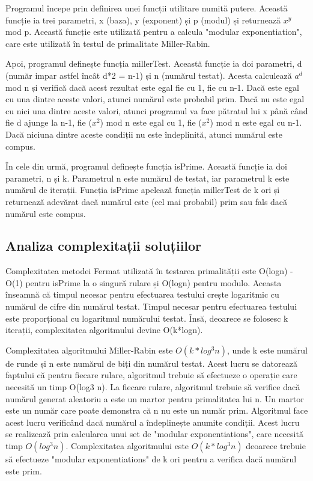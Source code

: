 \documentclass[runningheads]{llncs}
\begin{document}
Programul începe prin definirea unei funcții utilitare numită putere. Această funcție ia trei parametri, x (baza), y (exponent) și p (modul) și
returnează $x^y$ mod p. Această funcție este utilizată pentru a calcula "modular exponentiation", care este utilizată în testul
de primalitate Miller-Rabin.

Apoi, programul definește funcția millerTest. Această funcție ia doi parametri, d (număr impar astfel încât d*2 = n-1) și n (numărul testat). Acesta calculează $a^d$ mod n și verifică
dacă acest rezultat este egal fie cu 1, fie cu n-1. Dacă este egal cu una dintre aceste valori, atunci numărul este probabil prim.
Dacă nu este egal cu nici una dintre aceste valori, atunci programul va face pătratul lui x până când fie d ajunge la n-1, fie ($x^2$) mod n
este egal cu 1, fie ($x^2$) mod n este egal cu n-1. Dacă niciuna dintre aceste condiții nu este îndeplinită, atunci numărul este compus.

În cele din urmă, programul definește funcția isPrime. Această funcție ia doi parametri, n și k. Parametrul n este numărul de testat,
iar parametrul k este numărul de iterații. Funcția isPrime apelează funcția millerTest de k ori și returnează adevărat dacă numărul
este (cel mai probabil) prim sau fals dacă numărul este compus.

\subsection{Analiza complexitații soluțiilor}
\quad \quad Complexitatea metodei Fermat utilizată în testarea primalității este O(logn) - O(1) pentru isPrime la o singură rulare
și O(logn) pentru modulo. Aceasta înseamnă că timpul necesar pentru efectuarea testului crește logaritmic cu numărul de cifre
din numărul testat. Timpul necesar pentru efectuarea testului este proporțional cu logaritmul numărului testat. Însă, deoarece
se folosesc k iterații, complexitatea algoritmului devine O(k*logn).

Complexitatea algoritmului Miller-Rabin este $O(k*log^{3}n)$, unde k este numărul de runde și n este numărul de biți din numărul testat.
Acest lucru se datorează faptului că pentru fiecare rulare, algoritmul trebuie să efectueze o operație care necesită un timp O(log3 n).
La fiecare rulare, algoritmul trebuie să verifice dacă numărul generat aleatoriu a este un martor pentru primalitatea lui n.
Un martor este un număr care poate demonstra că n nu este un număr prim. Algoritmul face acest lucru verificând dacă numărul a
îndeplinește anumite condiții. Acest lucru se realizează prin calcularea unui set de "modular exponentiations", care necesită timp $O(log^{3}n)$.
Complexitatea algoritmului este $O(k*log^{3}n)$ deoarece trebuie să efectueze "modular exponentiations" de k ori pentru a verifica
dacă numărul este prim.
\end{document}

